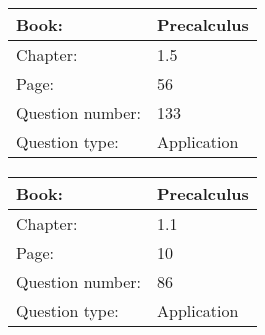 \documentclass{article}
\begin{document}
            \paragraph{}
            \begin{tabularx}{1\textwidth}{
                    p{}
                    p{}
                }
                \toprule
                Book: & Precalculus
                \\
                \midrule
                Chapter: & 1.5
                \\
                \midrule
                Page: & 56
                \\
                \midrule
                Question number: & 133
                \\
                \midrule
                Question type: & Application
                \\
                \bottomrule
            \end{tabularx}
            
            \paragraph{}
            \begin{tabularx}{1\textwidth}{
                    p{}
                    p{}
                }
                \toprule
                Book: & Precalculus
                \\
                \midrule
                Chapter: & 1.1
                \\
                \midrule
                Page: & 10
                \\
                \midrule
                Question number: & 86
                \\
                \midrule
                Question type: & Application
                \\
                \bottomrule
            \end{tabularx}
            
\end{document}
